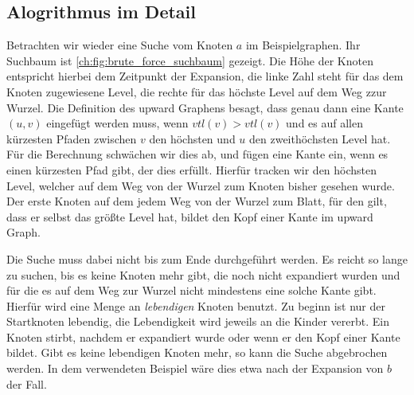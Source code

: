 \subsection{Alogrithmus im Detail}

Betrachten wir wieder eine Suche vom Knoten $a$ im Beispielgraphen.
Ihr Suchbaum ist \autoref{ch:fig:brute_force_suchbaum} gezeigt.
Die Höhe der Knoten entspricht hierbei dem Zeitpunkt der Expansion, die linke Zahl steht für das dem Knoten zugewiesene Level, die rechte für das höchste Level auf dem Weg zzur Wurzel.
Die Definition des upward Graphens besagt, dass genau dann eine Kante $(u, v)$ eingefügt werden muss, wenn ${vtl}(v) > {vtl}(v)$ und es auf allen kürzesten Pfaden zwischen $v$ den höchsten und $u$ den zweithöchsten Level hat.
Für die Berechnung schwächen wir dies ab, und fügen eine Kante ein, wenn es einen kürzesten Pfad gibt, der dies erfüllt.
Hierfür tracken wir den höchsten Level, welcher auf dem Weg von der Wurzel zum Knoten bisher gesehen wurde.
Der erste Knoten auf dem jedem Weg von der Wurzel zum Blatt, für den gilt, dass er selbst das größte Level hat, bildet den Kopf einer Kante im upward Graph.


Die Suche muss dabei nicht bis zum Ende durchgeführt werden.
Es reicht so lange zu suchen, bis es keine Knoten mehr gibt, die noch nicht expandiert wurden und für die es auf dem Weg zur Wurzel nicht mindestens eine solche Kante gibt.
Hierfür wird eine Menge an \emph{lebendigen} Knoten benutzt.
Zu beginn ist nur der Startknoten lebendig, die Lebendigkeit wird jeweils an die Kinder vererbt.
Ein Knoten stirbt, nachdem er expandiert wurde oder wenn er den Kopf einer Kante bildet.
Gibt es keine lebendigen Knoten mehr, so kann die Suche abgebrochen werden.
In dem verwendeten Beispiel wäre dies etwa nach der Expansion von $b$ der Fall.


